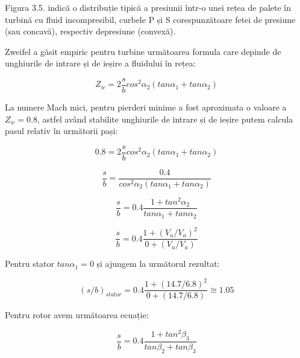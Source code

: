 Figura 3.5. indică o distribuție tipică a presiunii într-o unei rețea de palete în turbină cu fluid incompresibil, curbele P și S corespunzătoare fetei de presiune (sau concavă), respectiv depresiune (convexă).

Zweifel a găsit empiric pentru turbine următoarea formula care depinde de unghiurile de intrare și de ieșire a fluidului în rețea:

\begin{equation}
Z_w = 2 \frac{s}{b} cos^2\alpha_2 (tan\alpha_1 + tan\alpha_2)
\end{equation}

La numere Mach mici, pentru pierderi minime a fost aproximata o valoare a $Z_w = 0.8$, astfel având stabilite unghiurile de intrare și de ieșire putem calcula pasul relativ în următorii pași:

\begin{equation}
0.8 = 2 \frac{s}{b} cos^2\alpha_2 (tan\alpha_1 + tan\alpha_2)
\end{equation}

\begin{equation}
\frac{s}{b} = \frac{0.4}{cos^2\alpha_2 (tan\alpha_1 + tan\alpha_2)}
\end{equation}

\begin{equation}
\frac{s}{b} = 0.4 \frac{1+tan^2\alpha_2}{tan\alpha_1 + tan\alpha_2}
\end{equation}

\begin{equation}
\frac{s}{b} = 0.4 \frac{1 + (V_u / V_a)^2 } {0 + (V_u / V_a)}
\end{equation}

\vspace{5mm} %

Pentru stator $tan\alpha_1 = 0$ și ajungem la următorul rezultat:

\begin{equation}
(s/b)_{stator} = 0.4 \frac{1 + (14.7 / 6.8)^2 } {0 + (14.7 / 6.8)}\cong 1.05
\end{equation}

\vspace{5mm} %

Pentru rotor avem următoarea ecuație:

\begin{equation}
\frac{s}{b} = 0.4 \frac{1+tan^2\beta_3}{tan\beta_2 + tan\beta_3}
\end{equation}

